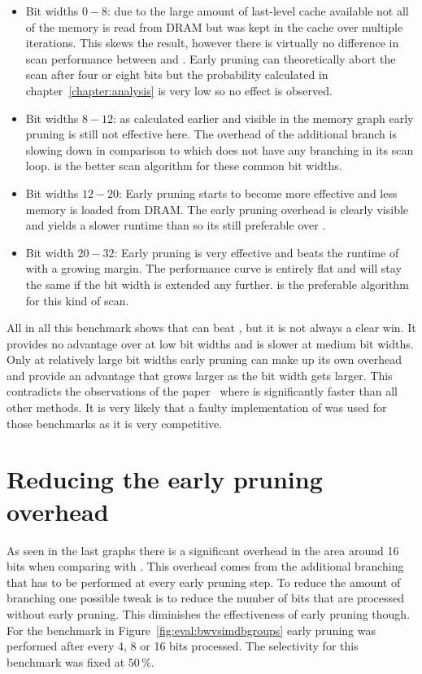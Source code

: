 \begin{itemize}
  \item Bit widths $0-8$: due to the large amount of last-level cache
  available not all of the memory is read from DRAM but was kept in the cache
  over multiple iterations. This skews the result, however there is virtually
  no difference in scan performance between \simdscan{} and \bwv{}. Early
  pruning can theoretically abort the scan after four or eight bits but the
  probability calculated in chapter~\ref{chapter:analysis} is very low so no
  effect is observed.
  \item Bit widths $8-12$: as calculated earlier and visible in the memory
  graph early pruning is still not effective here. The overhead of the additional
  branch is slowing down \bwv{} in comparison to \simdscan{} which does not have
  any branching in its scan loop. \simdscan{} is the better scan algorithm for
  these common bit widths.
  \item Bit widths $12-20$: Early pruning starts to become more effective and
  less memory is loaded from DRAM. The early pruning overhead is clearly
  visible and yields a slower runtime than \simdscan{} so its still preferable
  over \bwv{}.
  \item Bit width $20-32$: Early pruning is very effective and beats the
  runtime of \simdscan{} with a growing margin. The performance curve is
  entirely flat and will stay the same if the bit width is extended any further.
  \bwv{} is the preferable algorithm for this kind of scan.
\end{itemize}

All in all this benchmark shows that \bwv{} can beat \simdscan{}, but it is not
always a clear win. It provides no advantage over \simdscan{} at low bit widths
and is slower at medium bit widths. Only at relatively large bit widths early
pruning can make up its own overhead and provide an advantage that grows larger
as the bit width gets larger. This contradicts the observations of the
\bwv{} paper~\cite{BitWeaving} where \bwv{} is significantly faster than all
other methods. It is very likely that a faulty implementation of \simdscan{} was
used for those benchmarks as it is very competitive.

\section{Reducing the early pruning overhead}

As seen in the last graphs there is a significant overhead in the area around
16 bits when comparing \bwv{} with \simdscan{}. This overhead comes from the
additional branching that has to be performed at every early pruning step. To
reduce the amount of branching one possible tweak is to reduce the number of
bits that are processed without early pruning. This diminishes the
effectiveness of early pruning though. For the benchmark in
Figure~\ref{fig:eval:bwvsimdbgroups} early pruning was performed after every 4,
8 or 16 bits processed. The selectivity for this benchmark was fixed at $50\,\%$.

